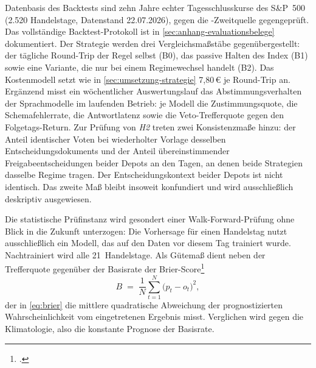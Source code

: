 Datenbasis des Backtests sind zehn Jahre echter Tagesschlusskurse des S\&P~500 (2.520
Handelstage, Datenstand 22.07.2026), gegen die -Zweitquelle gegengeprüft.
Das vollständige Backtest-Protokoll ist in \cref{sec:anhang-evaluationsbelege} dokumentiert.
Der Strategie werden drei Vergleichsmaßstäbe gegenübergestellt: der tägliche Round-Trip der
Regel selbst (B0), das passive Halten des Index (B1) sowie eine Variante, die nur bei einem
Regimewechsel handelt (B2). Das Kostenmodell setzt wie in \cref{sec:umsetzung-strategie}
7,80\,€ je Round-Trip an. Ergänzend misst ein wöchentlicher Auswertungslauf das Abstimmungsverhalten
der Sprachmodelle im laufenden Betrieb: je Modell die Zustimmungsquote, die
Schemafehlerrate, die Antwortlatenz sowie die Veto-Trefferquote gegen den Folgetags-Return.
Zur Prüfung von \emph{H2} treten zwei Konsistenzmaße hinzu: der Anteil identischer Voten bei
wiederholter Vorlage desselben Entscheidungsdokuments und der Anteil übereinstimmender
Freigabeentscheidungen beider Depots an den Tagen, an denen beide Strategien dasselbe Regime
tragen. Der Entscheidungskontext beider Depots ist nicht identisch. Das zweite Maß
bleibt insoweit konfundiert und wird ausschließlich deskriptiv ausgewiesen.

Die statistische Prüfinstanz wird gesondert einer Walk-Forward-Prüfung ohne Blick
in die Zukunft unterzogen: Die Vorhersage für einen Handelstag nutzt ausschließlich
ein Modell, das auf den Daten vor diesem Tag trainiert wurde. Nachtrainiert wird
alle 21~Handelstage. Als Gütemaß dient neben der Trefferquote gegenüber
der Basisrate der
Brier-Score\footcites[vgl.][S.~1--3]{brier1950}[zum Vergleich probabilistischer
Prognosen vgl.][S.~359--378]{gneitingRaftery2007}
\begin{equation}
  B \;=\; \frac{1}{N}\sum_{t=1}^{N}\bigl(p_t - o_t\bigr)^{2},
  \label{eq:brier}
\end{equation}
der in \cref{eq:brier} die mittlere quadratische Abweichung der prognostizierten Wahrscheinlichkeit vom
eingetretenen Ergebnis misst. Verglichen wird gegen die Klimatologie, also die konstante
Prognose der Basisrate.

